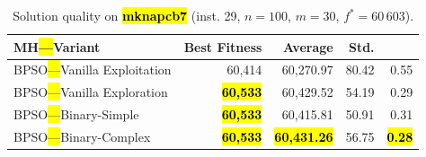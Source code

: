 \documentclass[mathematics,article,accept,moreauthors]{Definitions/mdpi}
\begin{document}
\vspace{-9pt}

\begin{table}[H]
  \small
  \caption{Solution quality on \textbf{\hl{mknapcb7}} (inst. 29, $n=100$, $m=30$, $f^*=60\,603$).}
  \label{tab:calidad_mknapcb7_29}
  \begin{tabularx}{\textwidth}{lRRRR}
    \toprule
    \textbf{MH\hl{---}Variant} &
    \textbf{Best Fitness} &
    \textbf{Average} &
    \textbf{Std.} &
    \textbf{} \\
    \midrule
    BPSO\hl{---}Vanilla Exploitation &          60,414 &         60,270.97 &  80.42 &         0.55 \\
    BPSO\hl{---}Vanilla Exploration  & \textbf{\hl{60,533}} &         60,429.52 &  54.19 &         0.29 \\
    BPSO\hl{---}Binary-Simple        & \textbf{\hl{60,533}} &         60,415.81 &  50.91 &         0.31 \\
    BPSO\hl{---}Binary-Complex       & \textbf{\hl{60,533}} & \textbf{\hl{60,431.26}} &  56.75 & \textbf{\hl{0.28}} \\


\bottomrule
\end{tabularx} %
\end{table}
\end{document}
